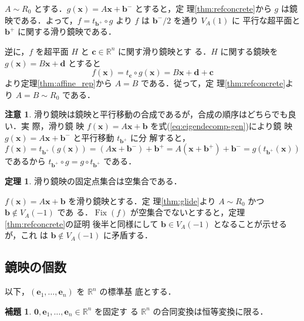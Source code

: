 \documentclass[11pt, uplatex, dvipdfmx, titlepage]{jsarticle}
\makeatletter
\DeclareMathOperator{\Fix}{Fix}
\renewenvironment{proof}[1][\proofname]{\par
  \pushQED{\qed}%
  \normalfont \topsep6\p@\@plus6\p@\relax
  \trivlist
  \item[\hskip\labelsep
         \bfseries
    {#1}]\ignorespaces
}{%
  \popQED\endtrivlist\@endpefalse
}
\theoremstyle{definition}
\newtheorem{theorem}{定理}[section]
\newtheorem{lemma}{補題}[section]
\renewcommand{\proofname}{\textbf{証明}}
\newtheorem*{remark}{注意}
\makeatother
\begin{document}
\begin{proof}
  $A \sim R_0$ とする．$g(\bm{x}) = A\bm{x} + \bm{b}^{-}$ とすると，定
  理\ref{thm:refconcrete}から $g$ は鏡映である．よって，$f =
  t_{\bm{b}^{+}} \circ g$ より $f$ は $\bm{b}^{-}/2$ を通り $V_A(1)$ に
  平行な超平面と $\bm{b}^{+}$ に関する滑り鏡映である．

  逆に，$f$ を超平面 $H$ と $\bm{c} \in \mathbb{R}^n$ に関す滑り鏡映とす
  る．$H$ に関する鏡映を $g(\bm{x}) = B\bm{x} + \bm{d}$ とすると
  \[
    f(\bm{x}) = t_{\bm{c}}\circ g(\bm{x}) = B\bm{x} + \bm{d} + \bm{c}
  \]
  より定理\ref{thm:affine_rep}から $A=B$ である．従って，定
  理\ref{thm:refconcrete}より $A =B\sim R_0$ である．
\end{proof}

\begin{remark}
  滑り鏡映は鏡映と平行移動の合成であるが，合成の順序はどちらでも良い．実
  際，滑り鏡
  映 $f(\bm{x})=A\bm{x}+\bm{b}$ を式(\ref{eq:eigendecomp-gen})により鏡
  映 $g(\bm{x}) = A\bm{x} + \bm{b}^{-}$ と平行移動 $t_{\bm{b}^{+}}$ に分
  解すると，
  \[
    f(\bm{x}) = t_{\bm{b}^{+}} \left( g(\bm{x}) \right)= \left(A\bm{x} + \bm{b}^{-}\right) + \bm{b}^{+}
    = A\left(\bm{x}+\bm{b}^{+}\right) + \bm{b}^{-} = g\left( t_{\bm{b}^{+}}(\bm{x})\right) 
  \]
  であるから $t_{\bm{b}^{+}} \circ g = g \circ t_{\bm{b}^{+}}$ である．
\end{remark}

\begin{theorem}\label{thm:inv-glide}
  滑り鏡映の固定点集合は空集合である．
\end{theorem}
\begin{proof}
  $f(\bm{x}) = A\bm{x} + \bm{b}$ を滑り鏡映とする．定
  理\ref{thm:glide}より $A \sim R_0$ かつ $\bm{b} \notin V_A(-1)$ であ
  る．$\Fix(f)$ が空集合でないとすると，定理\ref{thm:refconcrete}の証明
  後半と同様にして $\bm{b} \in V_A(-1)$ となることが示せるが，これ
  は $\bm{b} \notin V_A(-1)$ に矛盾する．
\end{proof}



\subsection{鏡映の個数}

以下，$(\bm{e}_1, \ldots, \bm{e}_n) $ を $\mathbb{R}^n$ の標準基
底とする．

\begin{lemma}\label{lem:0id}
  $\bm{0}, \bm{e}_1, \ldots, \bm{e}_n \in \mathbb{R}^n$ を固定す
  る $\mathbb{R}^n$ の合同変換は恒等変換に限る．
\end{lemma}
\end{document}
